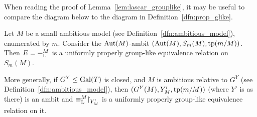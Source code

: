 	When reading the proof of Lemma~\ref{lem:lascar_grouplike}, it may be useful to compare the diagram below to the diagram in Definition~\ref{dfn:prop_glike}.
	\begin{center}
	\end{center}
	\begin{lem}
		\label{lem:lascar_grouplike}
		Let $M$ be a small ambitious model (see Definition~\ref{dfn:ambitious_model}), enumerated by $m$. Consider the $\operatorname{{Aut}}(M)$-ambit $(\operatorname{{Aut}}(M),S_m(M),\operatorname{{tp}}(m/M))$. Then $E={\equiv_{\mathrm{L}}^M}$ is a uniformly properly group-like equivalence relation on $S_m(M)$.
		
		More generally, if $G^Y\leq \operatorname{{Gal}}(T)$ is closed, and $M$ is ambitious relative to $G^Y$ (see Definition~\ref{dfn:ambitious_model}), then $(G^Y(M),Y'_M,\operatorname{{tp}}(m/M))$ (where $Y'$ is as there) is an ambit and ${\equiv_{\mathrm{L}}^M}\mathord{\upharpoonright}_{Y'_M}$ is a uniformly properly group-like equivalence relation on it.
	\end{lem}
